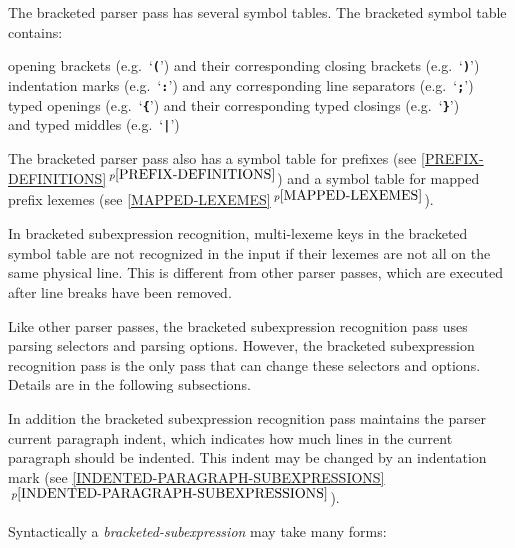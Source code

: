 \documentclass[12pt]{article}
\newcommand{\TT}[1]{{\tt \bfseries #1}}
\newcommand{\itemref}[1]{\ref{#1}$\,^{p\pageref{#1}}$}
\newenvironment{indpar}[1][0.3in]%
	{\begin{list}{}%
		     {\setlength{\itemsep}{0in}%
		      \setlength{\topsep}{0in}%
		      \setlength{\parsep}{1ex}%
		      \setlength{\labelwidth}{#1}%
		      \setlength{\leftmargin}{#1}%
		      \addtolength{\leftmargin}{\labelsep}}%
	 \item}%
	{\end{list}}
\begin{document}
The bracketed parser pass has several symbol tables.  The bracketed
symbol table contains:
\begin{indpar}[0.5in]
\hspace*{-0.2in}opening brackets (e.g.~`\TT{(}') and their
    corresponding closing brackets (e.g.~`\TT{)}') \\
\hspace*{-0.2in}indentation marks (e.g.~`\TT{:}')
    and any corresponding line separators (e.g.~`\TT{;}') \\
\hspace*{-0.2in}typed openings (e.g.~`\TT{\{}') and their
      corresponding typed closings (e.g.~`\TT{\}}') \\
      and typed middles (e.g.~`\TT{|}')
\end{indpar}

The bracketed parser pass also has a symbol table
for prefixes
(see \itemref{PREFIX-DEFINITIONS})
and a symbol table for mapped prefix lexemes (see \itemref{MAPPED-LEXEMES}).

In bracketed subexpression recognition, 
multi-lexeme keys in the bracketed symbol table
are not recognized in the
input if their lexemes are not all on the same physical line.
This is different from other parser passes, which are executed
after line breaks have been removed.

Like other parser passes, the bracketed subexpression recognition pass uses
parsing selectors and parsing options.
However, the bracketed subexpression recognition pass
is the only pass that can change these selectors and options.  Details are in
the following subsections.

In addition the bracketed subexpression recognition pass maintains
the parser current paragraph indent, which indicates how much
lines in the current paragraph should be indented.  This indent
may be changed by an indentation mark
(see \itemref{INDENTED-PARAGRAPH-SUBEXPRESSIONS}).

Syntactically a {\em bracketed-subexpression} may take many forms:
\end{document}
